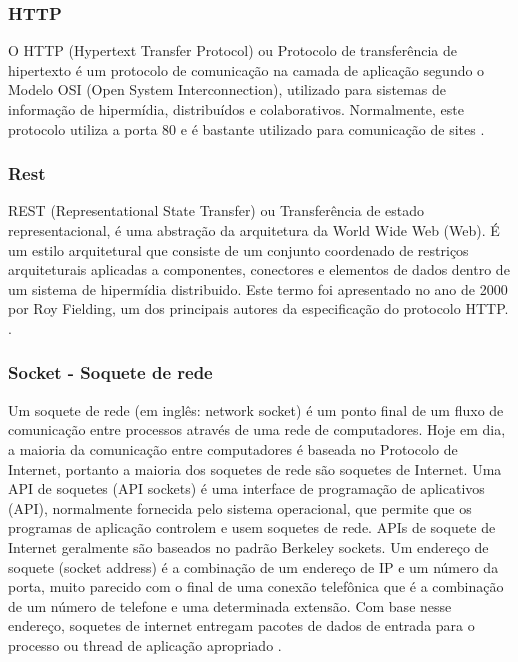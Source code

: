 \documentclass[journal]{IEEEtran}
\begin{document}
\subsubsection{HTTP}
O HTTP (Hypertext Transfer Protocol) ou Protocolo de transferência de hipertexto é um protocolo de comunicação na camada de aplicação segundo o Modelo OSI (Open System Interconnection), utilizado para sistemas de informação de hipermídia, distribuídos e colaborativos. Normalmente, este protocolo utiliza a porta 80 e é bastante utilizado para comunicação de sites \cite{oficinahttp}.


\subsubsection{Rest}

REST (Representational State Transfer) ou Transferência de estado representacional, é uma abstração da arquitetura da World Wide Web (Web). É um estilo arquitetural que consiste de um conjunto coordenado de restriços arquiteturais aplicadas a componentes, conectores e elementos de dados dentro de um sistema de hipermídia distribuido. Este termo foi apresentado no ano de 2000 por Roy Fielding, um dos principais autores da especificação do protocolo HTTP. \cite{fieldingrest}.

\subsubsection{Socket - Soquete de rede}

Um soquete de rede (em inglês: network socket) é um ponto final de um fluxo de comunicação entre processos através de uma rede de computadores. Hoje em dia, a maioria da comunicação entre computadores é baseada no Protocolo de Internet, portanto a maioria dos soquetes de rede são soquetes de Internet. Uma API de soquetes (API sockets) é uma interface de programação de aplicativos (API), normalmente fornecida pelo sistema operacional, que permite que os programas de aplicação controlem e usem soquetes de rede. APIs de soquete de Internet geralmente são baseados no padrão Berkeley sockets. Um endereço de soquete (socket address) é a combinação de um endereço de IP e um número da porta, muito parecido com o final de uma conexão telefônica que é a combinação de um número de telefone e uma determinada extensão. Com base nesse endereço, soquetes de internet entregam pacotes de dados de entrada para o processo ou thread de aplicação apropriado \cite{pedropintosocket}.
\end{document}
